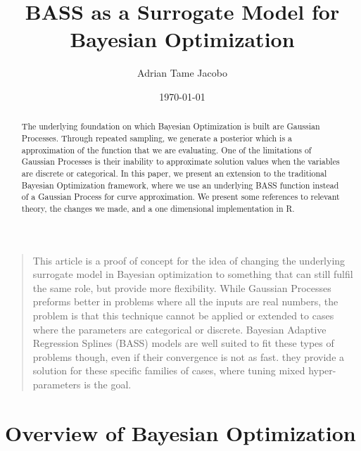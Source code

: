 \documentclass[%
 aip,
 amsmath,amssymb,
 reprint,%
]{revtex4-1}
\begin{document}

\title[BASS for Bayesian Optimization]{BASS as a Surrogate Model for Bayesian Optimization}
\author{Adrian Tame Jacobo}


\date{\today}%

\begin{abstract}
The underlying foundation on which Bayesian Optimization is built are Gaussian Processes. Through repeated sampling, we generate a posterior which is a approximation of the function that we are evaluating. One of the limitations of Gaussian Processes is their inability to approximate solution values when the variables are discrete or categorical. In this paper, we present an extension to the traditional Bayesian Optimization framework, where we use an underlying BASS function instead of a Gaussian Process for curve approximation. We present some references to relevant theory, the changes we made, and a one dimensional implementation in R. 
\end{abstract}

\maketitle

\begin{quotation}
This article is a proof of concept for the idea of changing the underlying surrogate model in Bayesian optimization to something that can still fulfil the same role, but provide more flexibility. While Gaussian Processes preforms better in problems where all the inputs are real numbers, the problem is that this technique cannot be applied or extended to cases where the parameters are categorical or discrete. Bayesian Adaptive Regression Splines (BASS) models are well suited to fit these types of problems though, even if their convergence is not as fast. they provide a solution for these specific families of cases, where tuning mixed hyper-parameters is the goal. 
\end{quotation}

\section{\label{sec:level1}Overview of Bayesian Optimization}
\end{document}
